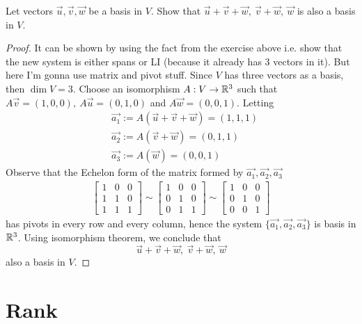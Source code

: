 \documentclass{article}
\begin{document}
\begin{exercise}
  Let vectors $\vec{u},\vec{v},\vec{w}$ be a basis in $V$. Show that
  $\vec{u}+\vec{v}+\vec{w},~\vec{v}+\vec{w},~\vec{w}$ is also
  a basis in $V$.
\end{exercise}
\begin{proof}
  It can be shown by using the fact from the exercise above
  i.e. show that the new system is either spans or LI 
  (because it already has 3 vectors in it).
  But here I'm gonna use matrix and pivot stuff. 
  Since $V$ has three vectors as a basis, then
  $\dim V=3$. Choose an isomorphism $A:V\to\R^3$ such that
  $A\vec{v}=(1,0,0),~A\vec{u}=(0,1,0)$ and $A\vec{w}=(0,0,1)$. 
  Letting
  \begin{align*}
    &\vec{a_1}:=A(\vec{u}+\vec{v}+\vec{w})=(1,1,1)\\
    &\vec{a_2}:=A(\vec{v}+\vec{w})=(0,1,1)\\
    &\vec{a_3}:=A(\vec{w})=(0,0,1)
  \end{align*}
  Observe that the Echelon form of the matrix formed by 
  $\vec{a_1},\vec{a_2},\vec{a_3}$
  \begin{align*}
    \begin{bmatrix} 1&0&0\\ 1&1&0\\ 1&1&1 \end{bmatrix}\sim
    \begin{bmatrix} 1&0&0\\ 0&1&0\\ 0&1&1 \end{bmatrix}\sim
    \begin{bmatrix} 1&0&0\\ 0&1&0\\ 0&0&1 \end{bmatrix}
  \end{align*}
  has pivots in every row and every column, hence the system
  $\{\vec{a_1},\vec{a_2},\vec{a_3}\}$ is basis in $\R^3$. Using
  isomorphism theorem, we conclude that
  \[\vec{u}+\vec{v}+\vec{w},~\vec{v}+\vec{w},~\vec{w}\]
  also a basis in $V$.
\end{proof}



\newpage
\section{Rank}
\end{document}
